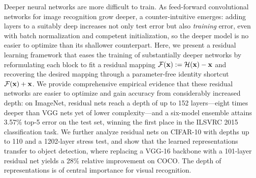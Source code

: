 Deeper neural networks are more difficult to train. As feed-forward convolutional
networks for image recognition grow deeper, a counter-intuitive \degprob emerges:
adding layers to a suitably deep \plainnet increases not only test error but also
\emph{training} error, even with batch normalization and competent initialization,
so the deeper model is no easier to optimize than its shallower counterpart. Here,
we present a residual learning framework that eases the training of substantially
deeper networks by reformulating each block to fit a residual mapping
$\mathcal{F}(\mathbf{x}) := \mathcal{H}(\mathbf{x}) - \mathbf{x}$ and recovering the desired mapping through a
parameter-free identity shortcut $\mathcal{F}(\mathbf{x}) + \mathbf{x}$. We provide comprehensive
empirical evidence that these residual networks are easier to optimize and gain
accuracy from considerably increased depth: on ImageNet, residual nets reach a depth
of up to 152 layers---eight times deeper than VGG nets yet of lower complexity---and a
six-model ensemble attains 3.57\% top-5 error on the test set, winning the first place
in the ILSVRC 2015 classification task. We further analyze residual nets on CIFAR-10
with depths up to 110 and a 1202-layer stress test, and show that the learned
representations transfer to object detection, where replacing a VGG-16 backbone with a
101-layer residual net yields a 28\% relative improvement on COCO. The depth of
representations is of central importance for visual recognition.

